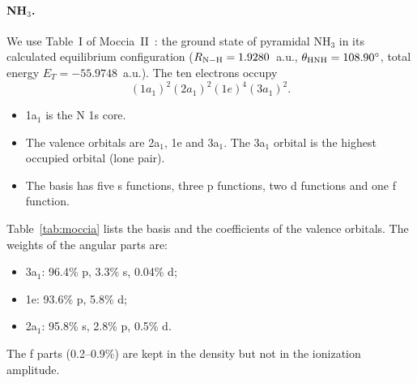 \documentclass[11pt,a4paper]{article}
\newcommand{\NH}{NH$_3$}
\newcommand{\aone}{3a$_1$}
\newcommand{\atwo}{2a$_1$}
\begin{document}
\paragraph{\NH.} We use Table~I of Moccia~II~\cite{Moccia1964b}: the ground state of pyramidal
\NH{} in its calculated equilibrium configuration ($R_{\rm N-H}=1.9280$~a.u.,
$\theta_{\rm HNH}=108.90^\circ$, total energy $E_T=-55.9748$~a.u.). The ten electrons occupy
\begin{equation}
(1a_1)^2(2a_1)^2(1e)^4(3a_1)^2 .
\end{equation}
\begin{itemize}
\item 1a$_1$ is the N 1s core.
\item The valence orbitals are \atwo, 1e and \aone. The \aone{} orbital is the highest occupied
  orbital (lone pair).
\item The basis has five s functions, three p functions, two d functions and one f function.
\end{itemize}
Table~\ref{tab:moccia} lists the basis and the coefficients of the valence orbitals. The weights of
the angular parts are:
\begin{itemize}
\item \aone: 96.4\% p, 3.3\% s, 0.04\% d;
\item 1e: 93.6\% p, 5.8\% d;
\item \atwo: 95.8\% s, 2.8\% p, 0.5\% d.
\end{itemize}
The f parts (0.2--0.9\%) are kept in the density but not in the ionization amplitude.
\end{document}
